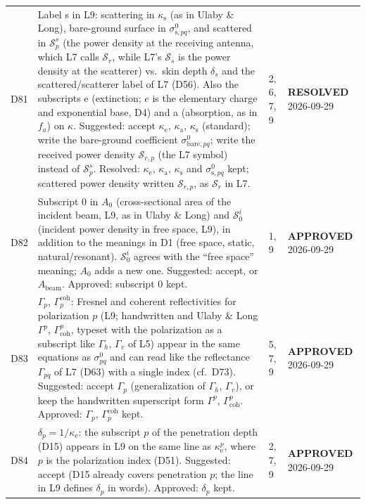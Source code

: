 \documentclass[11pt, oneside]{article}
\newcommand{\approved}{\textbf{APPROVED}}
\newcommand{\resolved}{\textbf{RESOLVED}}
\begin{document}
\begin{longtable}{l >{\raggedright\arraybackslash}p{} l l}
D81 & Label s in L9: scattering in $\kappa_\mathrm{s}$ (as in Ulaby \& Long), bare-ground surface in $\sigma^0_{\mathrm{s},pq}$, and scattered in $\mathcal{S}_p^s$ (the power density at the receiving antenna, which L7 calls $\mathcal{S}_r$, while L7's $\mathcal{S}_s$ is the power density at the scatterer) vs.\ skin depth $\delta_s$ and the scattered/scatterer label of L7 (D56). Also the subscripts e (extinction; $e$ is the elementary charge and exponential base, D4) and a (absorption, as in $f_a$) on $\kappa$. Suggested: accept $\kappa_\mathrm{e}$, $\kappa_\mathrm{a}$, $\kappa_\mathrm{s}$ (standard); write the bare-ground coefficient $\sigma^0_{\mathrm{bare},pq}$; write the received power density $\mathcal{S}_{r,p}$ (the L7 symbol) instead of $\mathcal{S}_p^s$. Resolved: $\kappa_\mathrm{e}$, $\kappa_\mathrm{a}$, $\kappa_\mathrm{s}$ and $\sigma^0_{\mathrm{s},pq}$ kept; scattered power density written $\mathcal{S}_{r,p}$, as $\mathcal{S}_r$ in L7. & 2, 6, 7, 9 & \resolved{} 2026-09-29 \\
D82 & Subscript 0 in $A_0$ (cross-sectional area of the incident beam, L9, as in Ulaby \& Long) and $\mathcal{S}_0^i$ (incident power density in free space, L9), in addition to the meanings in D1 (free space, static, natural/resonant). $\mathcal{S}_0^i$ agrees with the ``free space'' meaning; $A_0$ adds a new one. Suggested: accept, or $A_\mathrm{beam}$. Approved: subscript 0 kept. & 1, 9 & \approved{} 2026-09-29 \\
D83 & $\Gamma_p$, $\Gamma_p^\mathrm{coh}$: Fresnel and coherent reflectivities for polarization $p$ (L9; handwritten and Ulaby \& Long $\Gamma^p$, $\Gamma^p_\mathrm{coh}$, typeset with the polarization as a subscript like $\Gamma_h$, $\Gamma_v$ of L5) appear in the same equations as $\sigma^0_{pq}$ and can read like the reflectance $\Gamma_{pq}$ of L7 (D63) with a single index (cf.\ D73). Suggested: accept $\Gamma_p$ (generalization of $\Gamma_h$, $\Gamma_v$), or keep the handwritten superscript form $\Gamma^p$, $\Gamma^p_\mathrm{coh}$. Approved: $\Gamma_p$, $\Gamma_p^\mathrm{coh}$ kept. & 5, 7, 9 & \approved{} 2026-09-29 \\
D84 & $\delta_p = 1/\kappa_\mathrm{e}$: the subscript $p$ of the penetration depth (D15) appears in L9 on the same line as $\kappa_\mathrm{e}^p$, where $p$ is the polarization index (D51). Suggested: accept (D15 already covers penetration $p$; the line in L9 defines $\delta_p$ in words). Approved: $\delta_p$ kept. & 2, 7, 9 & \approved{} 2026-09-29 \\

\end{longtable}
\end{document}
